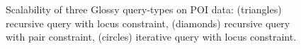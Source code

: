 \documentclass[11pt, oneside]{report}
\begin{document}
\begin{figure}[!t]
\centering
{}
\vspace{-4ex}
\caption{Scalability of three Glossy query-types on POI data: (triangles) recursive query with locus constraint, (diamonds) recursive query with pair constraint, (circles) iterative query with locus constraint.}
\vspace{-3ex}
\label{fig:glossy:scalability}
\end{figure}
\end{document}

